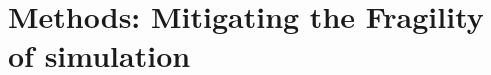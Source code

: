 \documentclass[aps,pra,twocolumn,notitlepage,nofootinbib,superscriptaddress]{revtex4-1}
\begin{document}
%
%
%
%
 


\section{Methods: Mitigating the Fragility of simulation}
\label{sec:methods}
\end{document}
